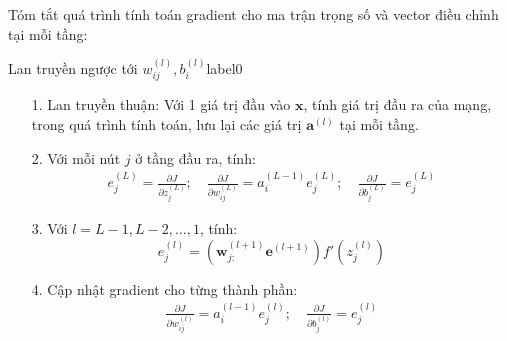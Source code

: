 Tóm tắt quá trình tính toán gradient cho ma trận trọng số và vector điều chỉnh tại mỗi tầng:




\begin{myalg}{{Lan truyền ngược tới} $w_{ij}^{(l)},
b_{i}^{(l)}$}{label0}
\begin{enumerate}
\item[1.] Lan truyền thuận: Với 1 giá trị đầu vào $\mathbf{x}$, tính giá trị đầu
ra của mạng, trong quá trình tính toán, lưu lại các giá trị $\mathbf{a}^{(l)}$ tại mỗi tầng.
\item[2.] Với mỗi nút $j$ ở tầng đầu ra, tính:
\begin{eqnarray}
e_j^{(L)} = \frac{\partial J}{\partial z_j^{(L)}}; \quad
\frac{\partial J}{\partial w_{ij}^{(L)}} = a_i^{(L-1)}e_j^{(L)}; \quad
\frac{\partial J}{\partial b_{j}^{(L)}} = e_j^{(L)}
\end{eqnarray}

\item[3.]  Với $l = L-1, L-2, ..., 1$, tính:
\begin{equation}
e_j^{(l)} = \left( \mathbf{w}_{j:}^{(l+1)} \mathbf{e}^{(l+1)} \right) f'(z_j^{(l)})
\end{equation}

\item[4.] Cập nhật gradient cho từng thành phần:
\begin{eqnarray}
\frac{\partial J}{\partial w_{ij}^{(l)}} = a_i^{(l-1)} e_j^{(l)}; \quad
\frac{\partial J}{\partial b_{j}^{(l)}} = e_j^{(l)}
\end{eqnarray}
\end{enumerate}
\end{myalg}



